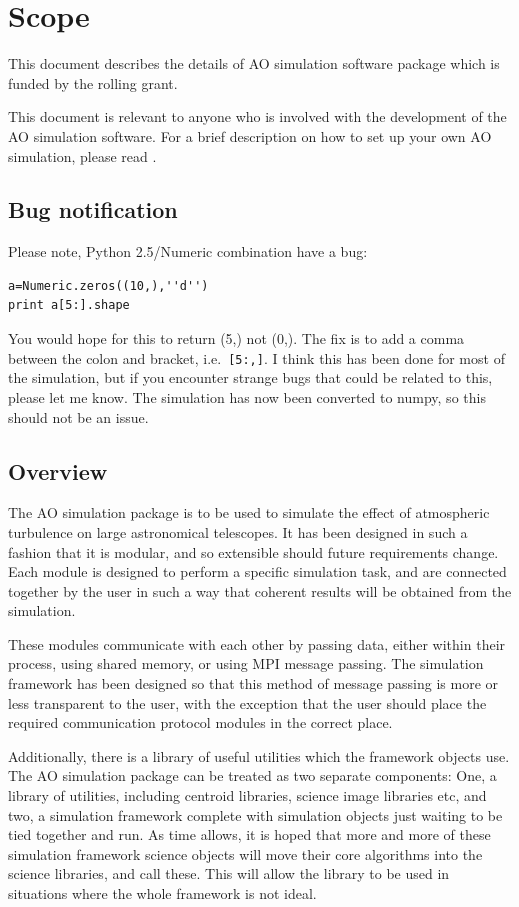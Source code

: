 \documentclass{article}
\begin{document}


\section{Scope}
This document describes the details of AO simulation software package
which is funded by the rolling grant.

This document is relevant to anyone who is involved with the
development of the AO simulation software.  For a brief description on
how to set up your own AO simulation, please read \citet{dummies}.
\subsection{Bug notification}
Please note, Python 2.5/Numeric combination have a bug:
\begin{verbatim}
a=Numeric.zeros((10,),''d'')
print a[5:].shape
\end{verbatim}
You would hope for this to return (5,) not (0,).  The fix is to add a
comma between the colon and bracket, i.e.\ \texttt{[5:,]}.  I think
this has been done for most of the simulation, but if you encounter
strange bugs that could be related to this, please let me know.  The
simulation has now been converted to numpy, so this should not be an issue.


\subsection{Overview}

The AO simulation package is to be used to simulate the effect of
atmospheric turbulence on large astronomical telescopes.  It has been
designed in such a fashion that it is modular, and so extensible
should future requirements change.  Each module is designed to perform
a specific simulation task, and are connected together by the user in
such a way that coherent results will be obtained from the simulation.

These modules communicate with each other by passing data, either
within their process, using shared memory, or using MPI message
passing.  The simulation framework has been designed so that this
method of message passing is more or less transparent to the user,
with the exception that the user should place the required
communication protocol modules in the correct place.

Additionally, there is a library of useful utilities which the
framework objects use.  The AO simulation package can be treated as
two separate components: One, a library of utilities, including
centroid libraries, science image libraries etc, and two, a simulation
framework complete with simulation objects just waiting to be tied
together and run.  As time allows, it is hoped that more and more of
these simulation framework science objects will move their core
algorithms into the science libraries, and call these.  This will
allow the library to be used in situations where the whole framework
is not ideal.
\end{document}
